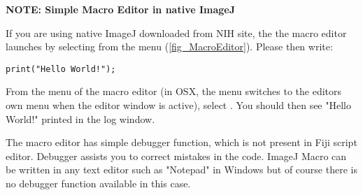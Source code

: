 \textbf{NOTE: Simple Macro Editor in native ImageJ}
\label{part:nativeeditor}

If you are using native ImageJ downloaded from NIH site, the the macro editor launches by selecting  from the menu (\ref{fig_MacroEditor}). Please then write:

\verb+print("Hello World!");+

From the menu of the macro editor (in OSX, the menu switches to the editors own menu when the editor window is active), select . You should then see "Hello World!" printed in the log window.

The macro editor has simple debugger function, which is not present in Fiji script editor. Debugger assists you to correct mistakes in the code. ImageJ Macro can be written in any text editor such as "Notepad" in Windows but of course there is no debugger function available in this case.